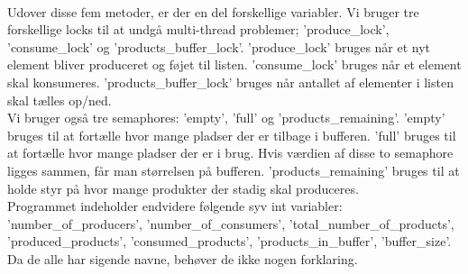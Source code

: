 \\Udover disse fem metoder, er der en del forskellige variabler. Vi bruger tre forskellige locks til at undgå multi-thread problemer; 'produce_lock', 'consume_lock' og 'products_buffer_lock'. 'produce_lock' bruges når et nyt element bliver produceret og føjet til listen. 'consume_lock' bruges når et element skal konsumeres. 'products_buffer_lock' bruges når antallet af elementer i listen skal tælles op/ned.
\\Vi bruger også tre semaphores: 'empty', 'full' og 'products_remaining'. 'empty' bruges til at fortælle hvor mange pladser der er tilbage i bufferen. 'full' bruges til at fortælle hvor mange pladser der er i brug. Hvis værdien af disse to semaphore ligges sammen, får man størrelsen på bufferen. 'products_remaining' bruges til at holde styr på hvor mange produkter der stadig skal produceres.
\\Programmet indeholder endvidere følgende syv int variabler: 'number_of_producers', 'number_of_consumers', 'total_number_of_products', 'produced_products', 'consumed_products', 'products_in_buffer', 'buffer_size'. Da de alle har sigende navne, behøver de ikke nogen forklaring.

